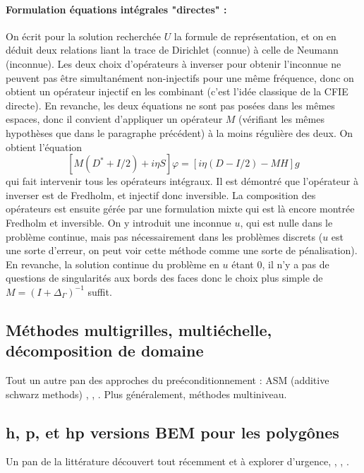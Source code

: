 \documentclass[11pt,a4paper]{article}
\begin{document}
\paragraph{Formulation équations intégrales "directes" :} 
On écrit pour la solution recherchée $U$ la formule de représentation, et on en déduit deux relations liant la trace de Dirichlet (connue) à celle de Neumann (inconnue). Les deux choix d'opérateurs à inverser pour obtenir l'inconnue ne peuvent pas être simultanément non-injectifs pour une même fréquence, donc on obtient un opérateur injectif en les combinant (c'est l'idée classique de la CFIE directe). En revanche, les deux équations ne sont pas posées dans les mêmes espaces, donc il convient d'appliquer un opérateur $M$ (vérifiant les mêmes hypothèses que dans le paragraphe précédent) à la moins régulière des deux. On obtient l'équation 
\[ \left[M(D^* + I/2) + i\eta S\right]\varphi = \left[i\eta(D-I/2)-MH\right]g\]
qui fait intervenir tous les opérateurs intégraux. Il est démontré que l'opérateur à inverser est de Fredholm, et injectif donc inversible. La composition des opérateurs est ensuite gérée par une formulation mixte qui est là encore montrée Fredholm et inversible. On y introduit une inconnue $u$, qui est nulle dans le problème continue, mais pas nécessairement dans les problèmes discrets ($u$ est une sorte d'erreur, on peut voir cette méthode comme une sorte de pénalisation). En revanche, la solution continue du problème en $u$ étant $0$, il n'y a pas de questions de singularités aux bords des faces donc le choix plus simple de $M = (I + \Delta_{\Gamma})^{-1}$ suffit. 

\subsection{Méthodes multigrilles, multiéchelle, décomposition de domaine}

Tout un autre pan des approches du preéconditionnement : ASM (additive schwarz methods) \cite{zhang1991multilevel}, \cite{nabors1994preconditioned}, \cite{tran1996additive}. Plus généralement, méthodes multiniveau. 

\subsection{h, p, et hp versions BEM pour les polygônes}

Un pan de la littérature découvert tout récemment et à explorer d'urgence, \cite{stephan1996hp}, \cite{maischak1997hp}, \cite{guo1994hp}. 
\end{document}
